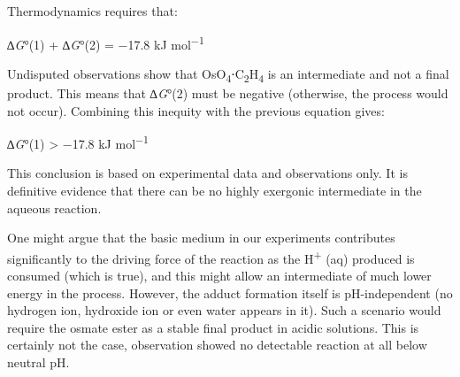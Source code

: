 \documentclass{article}
\begin{document}
Thermodynamics requires that:

\begin{center}
∆\emph{G}°(1) + ∆\emph{G}°(2) = −17.8 kJ mol\textsuperscript{−1}
\end{center}

Undisputed observations show that OsO\textsubscript{4}⋅C\textsubscript{2}H\textsubscript{4} is an intermediate and not a final product. This means that ∆\emph{G}°(2) must be negative (otherwise, the process would not occur). Combining this inequity with the previous equation gives:

\begin{center}
∆\emph{G}°(1) > −17.8 kJ mol\textsuperscript{−1}
\end{center}

This conclusion is based on experimental data and observations only. It is definitive evidence that there can be no highly exergonic intermediate in the aqueous reaction.

One might argue that the basic medium in our experiments contributes significantly to the driving force of the reaction as the H\textsuperscript{+} (aq) produced is consumed (which is true), and this might allow an intermediate of much lower energy in the process. However, the adduct formation itself is pH-independent (no hydrogen ion, hydroxide ion or even water appears in it). Such a scenario would require the osmate ester as a stable final product in acidic solutions. This is certainly not the case, observation showed no detectable reaction at all below neutral pH.
\end{document}
